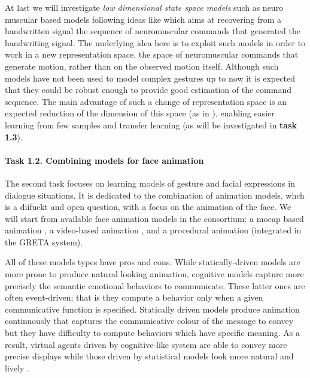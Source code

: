   At last we will investigate {\it low dimensional state space models} such as neuro muscular based models following ideas like \cite{DBLP:conf/icfhr/FischerPOS14} which aims at recovering from a handwritten signal the sequence of neuromuscular commands that generated the handwriting signal. The underlying idea here is to exploit such models in order to work in a new representation space, the space of neuromuscular commands that generate motion, rather than on the observed motion itself. 
  Although such models have not been used to model complex gestures up to now it is expected that they could be robust enough to provide good estimation of the command sequence. The main advantage of such a change of representation space is an expected reduction of the dimension of this space (as in \cite{DBLP:journals/pami/WangFH08}), enabling easier learning from few samples and transfer learning (as will be investigated in \textbf{task 1.3}).
% 


\paragraph{Task 1.2. Combining models for face animation } 

The second task focuses on learning models of gesture and facial expressions in dialogue situations. It is dedicated to the combination of animation models, whch is a diifuckt and open question, with a focus on the animation of the face. We will start from available face animation models in the consortium: a mocap based animation \cite{Ding2013}, a video-based animation \cite{TheseINRIA}, and a procedural animation \cite{Greta} (integrated in the GRETA system). 

All of these models types have pros and cons. While statically-driven models are more prone to produce natural looking animation, cognitive
models capture more precisely the semantic emotional behaviors to communicate. These latter ones are often event-driven; that is they compute a behavior only when a given communicative function is specified. Statically driven models produce animation continuously that captures the communicative colour of the message to convey but they have difficulty to compute behaviors which have specific meaning. As a result, virtual agents driven by cognitive-like system are able to convey more precise displays while those driven by statistical models look more natural and lively \cite{DBLP:conf/iva/LeeM12}.

